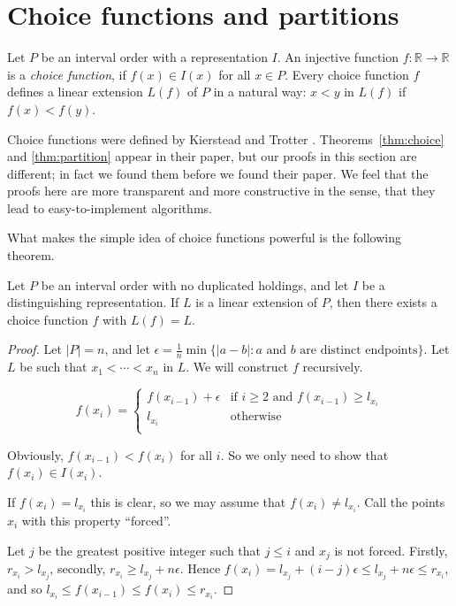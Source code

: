 \section{Choice functions and partitions}

Let $P$ be an interval order with a representation $I$. An injective function $f:\mathbb{R}\to\mathbb{R}$ is a \emph{choice function}, if $f(x)\in I(x)$ for all $x\in P$. Every choice function $f$ defines a linear extension $L(f)$ of $P$ in a natural way: $x<y$ in $L(f)$ if $f(x)<f(y)$.

Choice functions were defined by Kierstead and Trotter \cite{KT-00}. Theorems~\ref{thm:choice} and \ref{thm:partition} appear in their paper, but our proofs in this section are different; in fact we found them before we found their paper. We feel that the proofs here are more transparent and more constructive in the sense, that they lead to easy-to-implement algorithms.

What makes the simple idea of choice functions powerful is the following theorem.

\begin{theorem}\label{thm:choice}
Let $P$ be an interval order with no duplicated holdings, and let $I$ be a distinguishing representation. If $L$ is a linear extension of $P$, then there exists a choice function $f$ with $L(f)=L$.
\end{theorem}

\begin{proof}
Let $|P|=n$, and 
let $\epsilon=\frac{1}{n}\min\{|a-b|:\text{$a$ and $b$ are distinct endpoints}\}$.
Let $L$ be such that $x_1<\cdots<x_n$ in $L$. We will construct $f$ recursively. 

\[
f(x_i)=
\begin{cases}
f(x_{i-1})+\epsilon & \text{if $i\geq 2$ and $f(x_{i-1})\geq l_{x_i}$}\\
l_{x_i} & \text{otherwise}\\
\end{cases}
\]

Obviously, $f(x_{i-1})<f(x_i)$ for all $i$. So we only need to show that $f(x_i)\in I(x_i)$.

If $f(x_i)=l_{x_i}$ this is clear, so we may assume that $f(x_i)\neq l_{x_i}$. Call the points $x_i$ with this property ``forced''.

Let $j$ be the greatest positive integer such that $j\leq i$ and $x_j$ is not forced. %
Firstly, $r_{x_i}>l_{x_j}$, %
secondly, $r_{x_i}\geq l_{x_j}+n\epsilon$.
Hence $f(x_i)=l_{x_j}+(i-j)\epsilon\leq l_{x_j}+n\epsilon\leq r_{x_i}$, and so
$l_{x_i}\leq f(x_{i-1})\leq f(x_i)\leq r_{x_i}$.
\end{proof}

